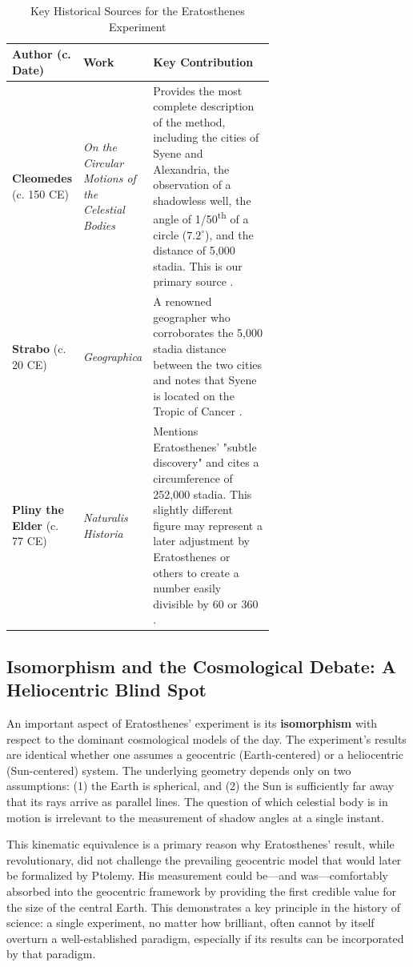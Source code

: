 \documentclass[11pt]{article}
\begin{document}
\begin{table}[htbp]
\centering
\caption{Key Historical Sources for the Eratosthenes Experiment}
\label{tab:historical_sources}
\small
\begin{tabular}{@{}lp{0.15\linewidth}p{0.5\linewidth}@{}}
\toprule
\textbf{Author (c. Date)} & \textbf{Work} & \textbf{Key Contribution} \\
\midrule
\textbf{Cleomedes} (c. 150 CE) & \textit{On the Circular Motions of the Celestial Bodies} & Provides the most complete description of the method, including the cities of Syene and Alexandria, the observation of a shadowless well, the angle of 1/50\textsuperscript{th} of a circle ($7.2^{\circ}$), and the distance of 5,000 stadia. This is our primary source \cite{Cleomedes150CE}. \\
\addlinespace
\textbf{Strabo} (c. 20 CE) & \textit{Geographica} & A renowned geographer who corroborates the 5,000 stadia distance between the two cities and notes that Syene is located on the Tropic of Cancer \cite{Strabo20CE}. \\
\addlinespace
\textbf{Pliny the Elder} (c. 77 CE) & \textit{Naturalis Historia} & Mentions Eratosthenes' "subtle discovery" and cites a circumference of 252,000 stadia. This slightly different figure may represent a later adjustment by Eratosthenes or others to create a number easily divisible by 60 or 360 \cite{Pliny77CE}. \\
\bottomrule
\end{tabular}
\end{table}

\subsection{Isomorphism and the Cosmological Debate: A Heliocentric Blind Spot}

An important aspect of Eratosthenes’ experiment is its \textbf{isomorphism} with respect to the dominant cosmological models of the day. The experiment's results are identical whether one assumes a geocentric (Earth-centered) or a heliocentric (Sun-centered) system. The underlying geometry depends only on two assumptions: (1) the Earth is spherical, and (2) the Sun is sufficiently far away that its rays arrive as parallel lines. The question of which celestial body is in motion is irrelevant to the measurement of shadow angles at a single instant.

This kinematic equivalence is a primary reason why Eratosthenes' result, while revolutionary, did not challenge the prevailing geocentric model that would later be formalized by Ptolemy. His measurement could be—and was—comfortably absorbed into the geocentric framework by providing the first credible value for the size of the central Earth. This demonstrates a key principle in the history of science: a single experiment, no matter how brilliant, often cannot by itself overturn a well-established paradigm, especially if its results can be incorporated by that paradigm.
\end{document}
